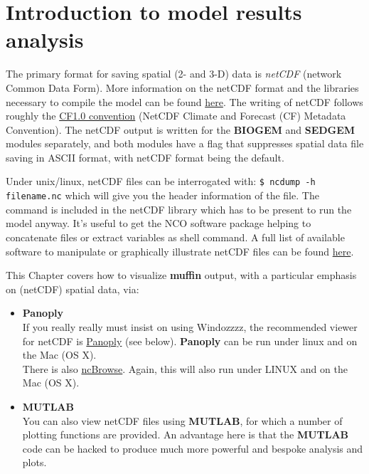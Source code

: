 \documentclass[11pt,fleqn]{book} %
\begin{document}
\chapter{Introduction to model results analysis}

\hfill \break

\vspace{21mm}

\noindent The primary format for saving spatial (2- and 3-D) data is \textit{netCDF} (network Common Data Form). More information on the netCDF format and the libraries necessary to compile the model can be found \href{http://www.unidata.ucar.edu/software/netcdf}{here}.
The writing of netCDF follows roughly the \href{http://www.cgd.ucar.edu/cms/eaton/cf-metadata/index.html}{CF1.0 convention} (NetCDF Climate and Forecast (CF) Metadata Convention).
The netCDF output is written for  the \textbf{BIOGEM} and \textbf{SEDGEM} modules separately, and both modules have a flag that suppresses spatial data file saving in ASCII format, with netCDF format being the default.

Under unix/linux, netCDF files can be interrogated with: \texttt{\$ ncdump -h filename.nc} which will give you the header information of the file. The command is included in the netCDF library which has to be present to run the model anyway. It's useful to get the NCO software package helping to concatenate files or extract variables as shell command. A full list of available software to manipulate or graphically illustrate netCDF files can be found \href{http://www.unidata.ucar.edu/software/netcdf/software.html}{here}.

\vspace{4pt}
This Chapter covers how to visualize \textbf{muffin} output, with a particular emphasis on (netCDF) spatial data, via:

\vspace{2pt}
\begin{itemize}
\vspace{1pt}
\item \textbf{Panoply}
\\ If you really really must insist on using Windozzzz, the recommended viewer for netCDF is \href{http://www.giss.nasa.gov/tools/panoply/}{Panoply} (see below). \textbf{Panoply} can be run under linux and on the Mac (OS X).
\\ There is also \href{http://www.epic.noaa.gov/java/ncBrowse/}{ncBrowse}. Again, this will also run under LINUX and on the Mac (OS X).
\vspace{1pt}
\item \textbf{MUTLAB}
\\ You can also view netCDF files using \textbf{MUTLAB}, for which a number of plotting functions are provided. An advantage here is that the \textbf{MUTLAB} code can be hacked to produce much more powerful and bespoke analysis and plots.
\end{itemize}
\end{document}

